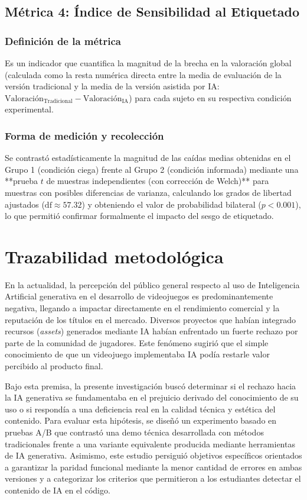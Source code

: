 \subsection{Métrica 4: Índice de Sensibilidad al Etiquetado}

\subsubsection{Definición de la métrica}
Es un indicador que cuantifica la magnitud de la brecha en la valoración global (calculada como la resta numérica directa entre la media de evaluación de la versión tradicional y la media de la versión asistida por IA: $\text{Valoración}_{\text{Tradicional}} - \text{Valoración}_{\text{IA}}$) para cada sujeto en su respectiva condición experimental.

\subsubsection{Forma de medición y recolección}
Se contrastó estadísticamente la magnitud de las caídas medias obtenidas en el Grupo 1 (condición ciega) frente al Grupo 2 (condición informada) mediante una **prueba $t$ de muestras independientes (con corrección de Welch)** para muestras con posibles diferencias de varianza, calculando los grados de libertad ajustados ($\text{df} \approx 57.32$) y obteniendo el valor de probabilidad bilateral ($p < 0.001$), lo que permitió confirmar formalmente el impacto del sesgo de etiquetado.

\section{Trazabilidad metodológica}

En la actualidad, la percepción del público general respecto al uso de Inteligencia Artificial generativa en el desarrollo de videojuegos es predominantemente negativa, llegando a impactar directamente en el rendimiento comercial y la reputación de los títulos en el mercado. Diversos proyectos que habían integrado recursos (\textit{assets}) generados mediante IA habían enfrentado un fuerte rechazo por parte de la comunidad de jugadores. Este fenómeno sugirió que el simple conocimiento de que un videojuego implementaba IA podía restarle valor percibido al producto final. 

Bajo esta premisa, la presente investigación buscó determinar si el rechazo hacia la IA generativa se fundamentaba en el prejuicio derivado del conocimiento de su uso o si respondía a una deficiencia real en la calidad técnica y estética del contenido. Para evaluar esta hipótesis, se diseñó un experimento basado en pruebas A/B que contrastó una demo técnica desarrollada con métodos tradicionales frente a una variante equivalente producida mediante herramientas de IA generativa. Asimismo, este estudio persiguió objetivos específicos orientados a garantizar la paridad funcional mediante la menor cantidad de errores en ambas versiones y a categorizar los criterios que permitieron a los estudiantes detectar el contenido de IA en el código. 

